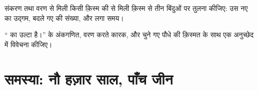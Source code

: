 \begin{exercise}[$\star\star\star$]\label{exo:g12:domesticated-plants:14}
संकरण तथा वरण से मिली किसी क़िस्म की  से मिली क़िस्म से तीन
बिंदुओं पर तुलना कीजिए: उस नए  का उद्गम, बदले गए  की
संख्या, और लगा समय।
\end{exercise}

\begin{exercise}[$\star\star\star$]\label{exo:g12:domesticated-plants:15}
``  का उल्टा है।''   के अंकगणित,
वरण करते कारक, और चुने गए पौधे की क़िस्मत के साथ एक अनुच्छेद में विवेचना
कीजिए।
\end{exercise}

\section{समस्या: नौ हज़ार साल, पाँच जीन}

